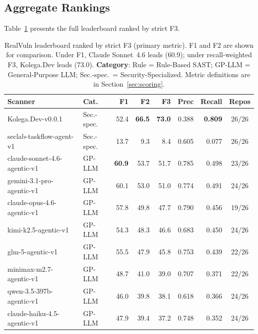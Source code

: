 \subsection{Aggregate Rankings}
\label{sec:results:aggregate}

Table~\ref{tab:leaderboard} presents the full leaderboard ranked by strict F3.

\begin{table}[t]
\centering
\caption{RealVuln leaderboard ranked by strict F3 (primary metric). F1 and F2 are shown for comparison. Under F1, Claude Sonnet~4.6 leads (60.9); under recall-weighted F3, Kolega.Dev leads (73.0). \textbf{Category}: Rule = Rule-Based SAST; GP-LLM = General-Purpose LLM; Sec.-spec.\ = Security-Specialized. Metric definitions are in Section~\ref{sec:scoring}.}
\label{tab:leaderboard}
\small
\begin{tabular}{@{}llrrrrrc@{}}
\toprule
\textbf{Scanner} & \textbf{Cat.} & \textbf{F1} & \textbf{F2} & \textbf{F3} & \textbf{Prec} & \textbf{Recall} & \textbf{Repos} \\
\midrule
Kolega.Dev-v0.0.1                   & Sec.-spec. & 52.4 & \textbf{66.5} & \textbf{73.0} & 0.388 & \textbf{0.809} & 26/26 \\
seclab-taskflow-agent-v1            & Sec.-spec. & 13.7 &  9.3 & 8.4           & 0.605 & 0.077          & 26/26 \\
\midrule
claude-sonnet-4.6-agentic-v1        & GP-LLM    & \textbf{60.9} & 53.7 & 51.7          & 0.785 & 0.498          & 23/26 \\
gemini-3.1-pro-agentic-v1           & GP-LLM    & 60.1 & 53.0 & 51.0          & 0.774 & 0.491          & 24/26 \\
claude-opus-4.6-agentic-v1          & GP-LLM    & 57.8 & 49.8 & 47.7          & 0.790 & 0.456          & 19/26 \\
kimi-k2.5-agentic-v1                & GP-LLM    & 54.3 & 48.3 & 46.6          & 0.683 & 0.450          & 24/26 \\
glm-5-agentic-v1                    & GP-LLM    & 55.5 & 47.9 & 45.8          & 0.753 & 0.439          & 22/26 \\
minimax-m2.7-agentic-v1             & GP-LLM    & 48.7 & 41.0 & 39.0          & 0.707 & 0.371          & 22/26 \\
qwen-3.5-397b-agentic-v1            & GP-LLM    & 46.0 & 39.8 & 38.1          & 0.618 & 0.366          & 24/26 \\
claude-haiku-4.5-agentic-v1         & GP-LLM    & 47.9 & 39.4 & 37.2          & 0.748 & 0.352          & 24/26 \\

\end{tabular}
\end{table}
